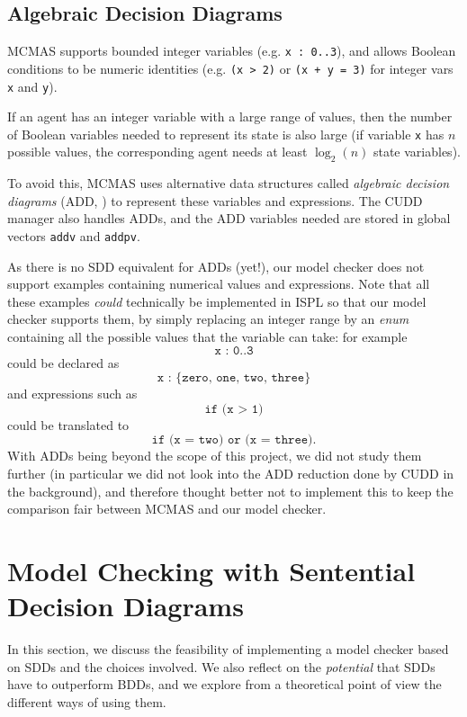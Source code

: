 \documentclass[11pt]{report}
\begin{document}
\subsection{Algebraic Decision Diagrams}
\label{algebraic_decision_diagrams}

MCMAS supports bounded integer variables (e.g. \texttt{x : 0..3}), and allows Boolean conditions to be numeric identities (e.g. \texttt{(x > 2)} or \texttt{(x + y = 3)} for integer vars \texttt{x} and \texttt{y}). 

If an agent has an integer variable with a large range of values, then the number of Boolean variables needed to represent its state is also large (if variable \texttt{x} has $n$ possible values, the corresponding agent needs at least $\log_2(n)$ state variables). 

To avoid this, MCMAS uses alternative data structures called \textit{algebraic decision diagrams} (ADD, \cite{add}) to represent these variables and expressions. The CUDD manager also handles ADDs, and the ADD variables needed are stored in global vectors \texttt{addv} and \texttt{addpv}.

As there is no SDD equivalent for ADDs (yet!), our model checker does not support examples containing numerical values and expressions.
Note that all these examples \textit{could} technically be implemented in ISPL so that our model checker supports them, by simply replacing an integer range by an \textit{enum} containing all the possible values that the variable can take: for example 
$$\texttt{x : 0..3} $$
could be declared as $$\texttt{x : \{zero, one, two, three\}}$$
and expressions such as $$\texttt{if (x > 1)}$$ could be translated to $$\texttt{if (x = two) or (x = three)}.$$
With ADDs being beyond the scope of this project, we did not study them further (in particular we did not look into the ADD reduction done by CUDD in the background), and therefore thought better not to implement this to keep the comparison fair between MCMAS and our model checker. 

\section{Model Checking with Sentential Decision Diagrams}

In this section, we discuss the feasibility of implementing a model checker based on SDDs and the choices involved. We also reflect on the \textit{potential }that SDDs have to outperform BDDs, and we explore from a theoretical point of view the different ways of using them.
\end{document}
